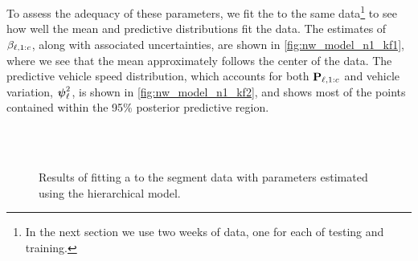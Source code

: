 To assess the adequacy of these parameters, we fit the \kf{} to the same data\footnote{In the next section we use two weeks of data, one for each of testing and training.} to see how well the mean and predictive distributions fit the data. The estimates of $\beta_{\ell,1:c}$, along with associated uncertainties, are shown in \cref{fig:nw_model_n1_kf1}, where we see that the mean approximately follows the center of the data. The predictive vehicle speed distribution, which accounts for both $\mathbf{P}_{\ell,1:c}$ and vehicle variation, $\mathbf{\boldsymbol{\psi}}_{\ell}^2$, is shown in \cref{fig:nw_model_n1_kf2}, and shows most of the points contained within the 95\% posterior predictive region.


\begin{knitrout}\small
{}\color{fgcolor}\begin{figure}

{\centering {}\\
\\

}

\caption[Results of fitting a \kf{} to the segment data with parameters estimated using the hierarchical model]{Results of fitting a \kf{} to the segment data with parameters estimated using the hierarchical model.}\label{fig:nw_model_n1_kf}
\end{figure}


\end{knitrout}



